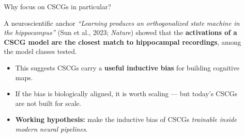 \documentclass[aspectratio=169,10pt]{beamer}
\begin{document}
\begin{frame}{Why focus on CSCGs in particular?}
  \begin{block}{A neuroscientific anchor}
    \textit{``Learning produces an orthogonalized state machine in the
    hippocampus''} (Sun et al., 2023; \emph{Nature}) showed that the
    \textbf{activations of a CSCG model are the closest match to
    hippocampal recordings}, among the model classes tested.
  \end{block}
  \vspace{0.4em}
  \begin{itemize}\setlength\itemsep{0.4em}
    \item This suggests CSCGs carry a \textbf{useful inductive bias} for
          building cognitive maps.
    \item If the bias is biologically aligned, it is worth scaling --- but
          today's CSCGs are not built for scale.
    \item \textbf{Working hypothesis:} make the inductive bias of CSCGs
          \emph{trainable inside modern neural pipelines}.
  \end{itemize}
\end{frame}
\end{document}
